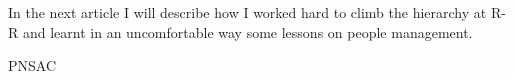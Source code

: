 In the next article I will describe how I worked hard to climb the
hierarchy at R-R and learnt in an uncomfortable way some lessons on
people management.


\begin{footnotesize}
    \raggedleft PNSAC\\
\end{footnotesize}



